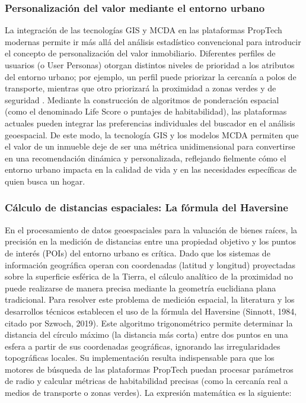 \subsubsection{Personalización del valor mediante el entorno urbano}

La integración de las tecnologías GIS y MCDA en las plataformas PropTech modernas permite ir más allá del análisis estadístico convencional para introducir el concepto de personalización del valor inmobiliario. Diferentes perfiles de usuarios (o User Personas) otorgan distintos niveles de prioridad a los atributos del entorno urbano; por ejemplo, un perfil puede priorizar la cercanía a polos de transporte, mientras que otro priorizará la proximidad a zonas verdes y de seguridad \parencite{DrojEtAl2024}. Mediante la construcción de algoritmos de ponderación espacial (como el denominado Life Score o puntajes de habitabilidad), las plataformas actuales pueden integrar las preferencias individuales del buscador en el análisis geoespacial. De este modo, la tecnología GIS y los modelos MCDA permiten que el valor de un inmueble deje de ser una métrica unidimensional para convertirse en una recomendación dinámica y personalizada, reflejando fielmente cómo el entorno urbano impacta en la calidad de vida y en las necesidades específicas de quien busca un hogar.

\subsubsection{Cálculo de distancias espaciales: La fórmula del Haversine}

En el procesamiento de datos geoespaciales para la valuación de bienes raíces, la precisión en la medición de distancias entre una propiedad objetivo y los puntos de interés (POIs) del entorno urbano es crítica. Dado que los sistemas de información geográfica operan con coordenadas (latitud y longitud) proyectadas sobre la superficie esférica de la Tierra, el cálculo analítico de la proximidad no puede realizarse de manera precisa mediante la geometría euclidiana plana tradicional. Para resolver este problema de medición espacial, la literatura y los desarrollos técnicos establecen el uso de la fórmula del Haversine (Sinnott, 1984, citado por Szwoch, 2019). Este algoritmo trigonométrico permite determinar la distancia del círculo máximo (la distancia más corta) entre dos puntos en una esfera a partir de sus coordenadas geográficas, ignorando las irregularidades topográficas locales. Su implementación resulta indispensable para que los motores de búsqueda de las plataformas PropTech puedan procesar parámetros de radio y calcular métricas de habitabilidad precisas (como la cercanía real a medios de transporte o zonas verdes). La expresión matemática es la siguiente:

